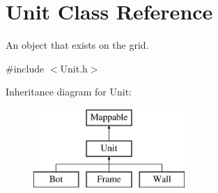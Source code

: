 \hypertarget{classUnit}{
\section{Unit Class Reference}
\label{classUnit}
}


An object that exists on the grid.  




{\ttfamily \#include $<$Unit.h$>$}

Inheritance diagram for Unit:\begin{figure}[H]
\begin{center}
\leavevmode
\includegraphics[height=3cm]{classUnit}
\end{center}
\end{figure}
